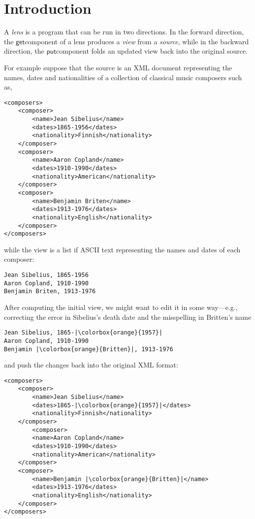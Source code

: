 \documentclass[acmsmall,review,anonymous]{acmart}\settopmatter{printfolios=true,printccs=false,printacmref=false}
\newcommand{\kw}[1]{\ensuremath{\mathsf{#1}}}
\newcommand{\get}{\ensuremath{\kw{get}}}
\newcommand{\pput}{\ensuremath{\kw{put}}}
\begin{document}
\section{Introduction}
A {\em lens} is a program that can be run in two directions. In the
forward direction, the \get component of a lens produces a {\em view}
from a {\em source}, while in the backward direction, the \pput component folds
an updated view back into the original source.

For example suppose that the source is an XML document representing the
names, dates and nationalities of a collection of classical music
composers such as,

\begin{lstlisting}
<composers>
    <composer>
        <name>Jean Sibelius</name>
        <dates>1865-1956</dates>
        <nationality>Finnish</nationality>
    </composer>
    <composer>
        <name>Aaron Copland</name>
        <dates>1910-1990</dates>
        <nationality>American</nationality>
    </composer>
    <composer>
        <name>Benjamin Briten</name>
        <dates>1913-1976</dates>
        <nationality>English</nationality>
    </composer>
</composers>
\end{lstlisting}

while the view is a list if ASCII text representing the names and dates of each
composer:
\begin{lstlisting}
Jean Sibelius, 1865-1956
Aaron Copland, 1910-1990
Benjamin Briten, 1913-1976
\end{lstlisting}

After computing the initial view, we might want to edit it in some way---e.g.,
correcting the error in Sibelius's death date and the misspelling in Britten's
name
\begin{lstlisting}
Jean Sibelius, 1865-|\colorbox{orange}{1957}|
Aaron Copland, 1910-1990
Benjamin |\colorbox{orange}{Britten}|, 1913-1976
\end{lstlisting}
and push the changes back into the original XML format:
\begin{lstlisting}
<composers>
    <composer>
        <name>Jean Sibelius</name>
        <dates>1865-|\colorbox{orange}{1957}|</dates>
        <nationality>Finnish</nationality>
    </composer>
        <composer>
        <name>Aaron Copland</name>
        <dates>1910-1990</dates>
        <nationality>American</nationality>
    </composer>
    <composer>
        <name>Benjamin |\colorbox{orange}{Britten}|</name>
        <dates>1913-1976</dates>
        <nationality>English</nationality>
    </composer>
</composers>
\end{lstlisting}
\end{document}

